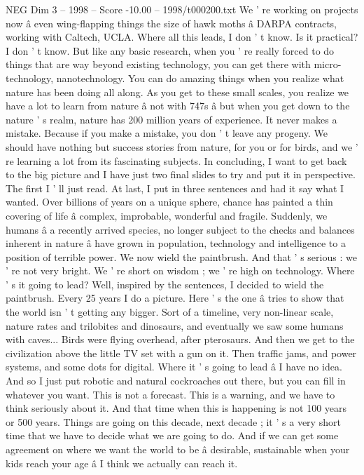 \begin{textsample}{NEG Dim 3 – 1998 – Score -10.00 – 1998/t000200.txt}
We ' re working on projects now â even wing-flapping things the size of hawk moths â DARPA contracts, working with Caltech, UCLA.
Where all this leads, I don ' t know.
Is it practical?
I don ' t know.
But like any basic research, when you ' re really forced to do things that are way beyond existing technology, you can get there with micro-technology, nanotechnology.
You can do amazing things when you realize what nature has been doing all along.
As you get to these small scales, you realize we have a lot to learn from nature â not with 747s â but when you get down to the nature ' s realm, nature has 200 million years of experience.
It never makes a mistake.
Because if you make a mistake, you don ' t leave any progeny.
We should have nothing but success stories from nature, for you or for birds, and we ' re learning a lot from its fascinating subjects.
In concluding, I want to get back to the big picture and I have just two final slides to try and put it in perspective.
The first I ' ll just read.
At last, I put in three sentences and had it say what I wanted.
Over billions of years on a unique sphere, chance has painted a thin covering of life â complex, improbable, wonderful and fragile.
Suddenly, we humans â a recently arrived species, no longer subject to the checks and balances inherent in nature â have grown in population, technology and intelligence to a position of terrible power.
We now wield the paintbrush.
And that ' s serious : we ' re not very bright.
We ' re short on wisdom ; we ' re high on technology.
Where ' s it going to lead?
Well, inspired by the sentences, I decided to wield the paintbrush.
Every 25 years I do a picture.
Here ' s the one â tries to show that the world isn ' t getting any bigger.
Sort of a timeline, very non-linear scale, nature rates and trilobites and dinosaurs, and eventually we saw some humans with caves...
Birds were flying overhead, after pterosaurs.
And then we get to the civilization above the little TV set with a gun on it.
Then traffic jams, and power systems, and some dots for digital.
Where it ' s going to lead â I have no idea.
And so I just put robotic and natural cockroaches out there, but you can fill in whatever you want.
This is not a forecast.
This is a warning, and we have to think seriously about it.
And that time when this is happening is not 100 years or 500 years.
Things are going on this decade, next decade ; it ' s a very short time that we have to decide what we are going to do.
And if we can get some agreement on where we want the world to be â desirable, sustainable when your kids reach your age â I think we actually can reach it.

\end{textsample}
